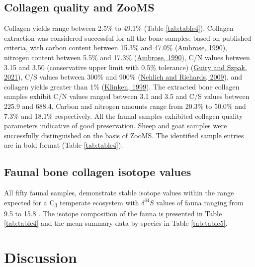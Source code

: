 \documentclass[preprint, 3p, authoryear]{elsarticle} %
\begin{document}
\hypertarget{collagen-quality-and-zooms}{%
\subsection{Collagen quality and ZooMS}\label{collagen-quality-and-zooms}}

Collagen yields range between 2.5\% to 49.1\% (Table \ref{tab:table4}). Collagen extraction was considered successful for all the bone samples, based on published criteria, with carbon content between 15.3\% and 47.0\% (\protect\hyperlink{ref-ambrose90}{Ambrose, 1990}), nitrogen content between 5.5\% and 17.3\% (\protect\hyperlink{ref-ambrose90}{Ambrose, 1990}), C/N values between 3.15 and 3.50 (conservative upper limit with 0.5\% tolerance) (\protect\hyperlink{ref-guiry_szpak21}{Guiry and Szpak, 2021}), C/S values between 300\% and 900\% (\protect\hyperlink{ref-nehlich_richards09}{Nehlich and Richards, 2009}), and collagen yields greater than 1\% (\protect\hyperlink{ref-vanklinken99}{Klinken, 1999}). The extracted bone collagen samples exhibit C/N values ranged between 3.1 and 3.5 and C/S values between 225.9 and 688.4. Carbon and nitrogen amounts range from 20.3\% to 50.0\% and 7.3\% and 18.1\% respectively. All the faunal samples exhibited collagen quality parameters indicative of good preservation.
Sheep and goat samples were successfully distinguished on the basis of ZooMS. The identified sample entries are in bold format (Table \ref{tab:table4}).

\hypertarget{faunal-bone-collagen-isotope-values}{%
\subsection{Faunal bone collagen isotope values}\label{faunal-bone-collagen-isotope-values}}

All fifty faunal samples, demonstrate stable isotope values within the range expected for a C\textsubscript{3} temperate ecosystem with \(\delta ^{34}S\) values of fauna ranging from 9.5 \text{\textperthousand} to 15.8 \text{\textperthousand}. The isotope composition of the fauna is presented in Table \ref{tab:table4} and the mean summary data by species in Table \ref{tab:table5}.

\hypertarget{discussion}{%
\section{Discussion}\label{discussion}}
\end{document}
